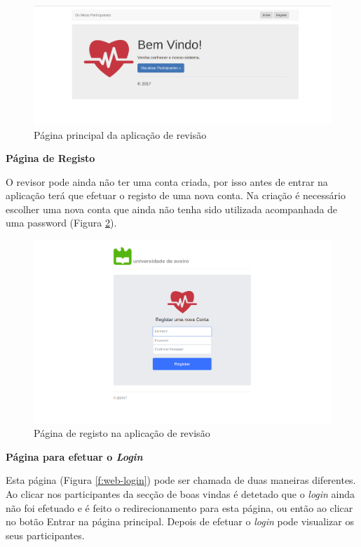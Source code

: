 \begin{figure}[H]
\centering
\includegraphics[width=1\textwidth]{imgs/home.png}
\caption[Página principal da aplicação de revisão]{Página principal da aplicação de revisão}
\label{f:web-home}
\end{figure}

\par
\textbf{Página de Registo}
\par
O revisor pode ainda não ter uma conta criada, por isso antes de entrar na aplicação terá que efetuar o registo de uma nova conta. Na criação é necessário escolher uma nova conta que ainda não tenha sido utilizada acompanhada de uma password (Figura \ref{f:web-registo}).

\begin{figure}[H]
\centering
\includegraphics[width=1\textwidth]{imgs/signup_web.png}
\caption[Página de registo na aplicação de revisão]{Página de registo na aplicação de revisão}
\label{f:web-registo}
\end{figure}

\par
\textbf{Página para efetuar o \textit{Login}}
\par
Esta página (Figura \ref{f:web-login}) pode ser chamada de duas maneiras diferentes. Ao clicar nos participantes da secção de boas vindas é detetado que o \textit{login} ainda não foi efetuado e é feito o redirecionamento para esta página, ou então ao clicar no botão Entrar na página principal. Depois de efetuar o \textit{login} pode visualizar os seus participantes.


